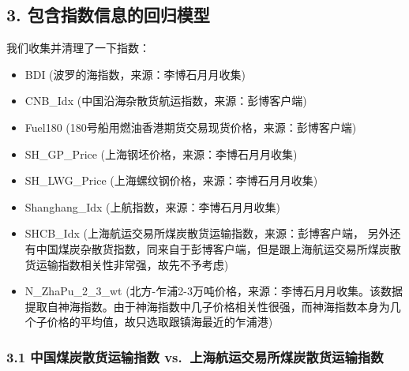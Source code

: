 \documentclass[]{article}
\providecommand{\tightlist}{%
  \setlength{\itemsep}{0pt}\setlength{\parskip}{0pt}}
\begin{document}
\subsection{3. 包含指数信息的回归模型}

我们收集并清理了一下指数：

\begin{itemize}
\tightlist
\item
  BDI (波罗的海指数，来源：李博石月月收集)\\
\item
  CNB\_Idx (中国沿海杂散货航运指数，来源：彭博客户端)
\item
  Fuel180 (180号船用燃油香港期货交易现货价格，来源：彭博客户端)
\item
  SH\_GP\_Price (上海钢坯价格，来源：李博石月月收集)\\
\item
  SH\_LWG\_Price (上海螺纹钢价格，来源：李博石月月收集)\\
\item
  Shanghang\_Idx (上航指数，来源：李博石月月收集)\\
\item
  SHCB\_Idx (上海航运交易所煤炭散货运输指数，来源：彭博客户端，
  另外还有中国煤炭杂散货指数，同来自于彭博客户端，但是跟上海航运交易所煤炭散货运输指数相关性非常强，故先不予考虑)
\item
  N\_ZhaPu\_2\_3\_wt
  (北方-乍浦2-3万吨价格，来源：李博石月月收集。该数据提取自神海指数。由于神海指数中几子价格相关性很强，而神海指数本身为几个子价格的平均值，故只选取跟镇海最近的乍浦港)
\end{itemize}

\subsubsection{3.1 中国煤炭散货运输指数
vs.~上海航运交易所煤炭散货运输指数}\label{-vs.}
\end{document}
